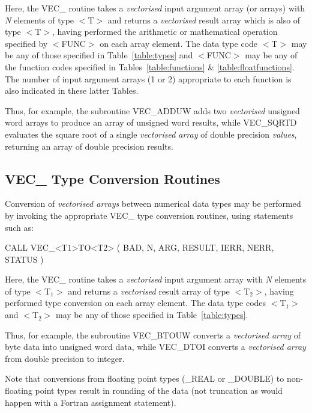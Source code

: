 \documentclass[11pt,nolof]{starlink}
\providecommand{\name}[1]{#1}
\providecommand{\fortvar}[1]{\emph{#1}}
\begin{document}
Here, the \name{VEC\_} routine takes a \emph{vectorised} input argument array
(or arrays) with \fortvar{N} elements of type \name{$<$T$>$} and returns a \emph{vectorised} result array which is also of type \name{$<$T$>$}, having performed
the arithmetic or mathematical operation specified by \name{$<$FUNC$>$} on
each array element.
The data type code \name{$<$T$>$} may be any of those specified in
Table~\ref{table:types} and \name{$<$FUNC$>$} may be any of the function
codes specified in Tables~\ref{table:functions} \&
\ref{table:floatfunctions}.
The number of input argument arrays (1 or 2) appropriate to each function is
also indicated in these latter Tables.

Thus, for example, the subroutine \name{VEC\_ADDUW} adds two \emph{vectorised}
unsigned word arrays to produce an array of unsigned word results, while
\name{VEC\_SQRTD} evaluates the square root of a single \emph{vectorised
array} of double precision \emph{values}, returning an array of double
precision results.

\subsection{\name{VEC\_} Type Conversion Routines}

Conversion of \emph{vectorised arrays} between numerical data types may be
performed by invoking the appropriate \name{VEC\_} type conversion routines,
using statements such as:

\begin{terminalv}
CALL VEC_<T1>TO<T2> ( BAD, N, ARG, RESULT, IERR, NERR, STATUS )
\end{terminalv}

Here, the \name{VEC\_} routine takes a \emph{vectorised} input argument array
with \fortvar{N} elements of type \name{$<$T$_{1}>$} and returns a \emph{vectorised} result array of type \name{$<$T$_{2}>$}, having performed type
conversion on each array element.
The data type codes \name{$<$T$_{1}>$} and \name{$<$T$_{2}>$} may be any of
those specified in Table~\ref{table:types}.

Thus, for example, the subroutine \name{VEC\_BTOUW} converts a \emph{vectorised array} of byte data into unsigned word data, while
\name{VEC\_DTOI} converts a \emph{vectorised array} from double precision to
integer.

Note that conversions from floating point types (\name{\_REAL} or
\name{\_DOUBLE}) to non-floating point types result in rounding of the data
(not truncation as would happen with a Fortran assignment statement).
\end{document}
